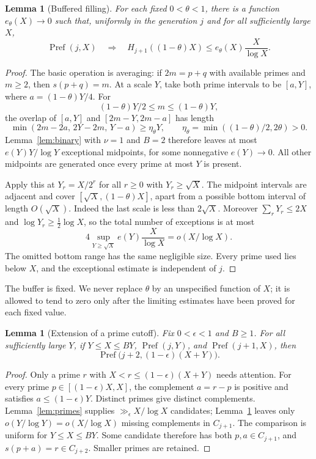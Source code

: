 \documentclass[11pt,letterpaper]{article}
\numberwithin{equation}{section}
\newtheorem{lemma}[theorem]{Lemma}
\theoremstyle{definition}
\theoremstyle{remark}
\DeclareMathOperator{\Pref}{Pref}
\begin{document}
\begin{lemma}[Buffered filling]\label{lem:buffer}
For each fixed $0<\theta<1$, there is a function $e_\theta(X)\to0$
such that, uniformly in the generation $j$ and for all sufficiently large $X$,
\begin{equation}\label{eq:buffer}
 \Pref(j,X)\quad\Longrightarrow\quad
 H_{j+1}((1-\theta)X)\le e_\theta(X)\frac X{\log X}.
\end{equation}
\end{lemma}

\begin{proof}
The basic operation is averaging: if $2m=p+q$ with available primes and
$m\ge2$, then $s(p+q)=m$.
At a scale $Y$, take both prime intervals to be $[a,Y]$, where
$a=(1-\theta)Y/4$. For
\[
 (1-\theta)Y/2\le m\le(1-\theta)Y,
\]
the overlap of $[a,Y]$ and $[2m-Y,2m-a]$ has length
\[
 \min(2m-2a,\,2Y-2m,\,Y-a)
 \ge\eta_\theta Y,\qquad
 \eta_\theta=\min((1-\theta)/2,2\theta)>0.
\]
Lemma~\ref{lem:binary} with $\nu=1$ and $B=2$ therefore leaves at most
$e(Y)Y/\log Y$ exceptional midpoints, for some nonnegative $e(Y)\to0$.
All other midpoints are generated once every prime at most $Y$ is present.

Apply this at $Y_r=X/2^r$ for all $r\ge0$ with $Y_r\ge\sqrt X$.
The midpoint intervals are adjacent and cover
$[\sqrt X,(1-\theta)X]$, apart from a possible bottom interval of
length $O(\sqrt X)$. Indeed the last scale is less than $2\sqrt X$.
Moreover $\sum_rY_r\le2X$ and $\log Y_r\ge\frac12\log X$, so the
total number of exceptions is at most
\[
 4\sup_{Y\ge\sqrt X}e(Y)\frac X{\log X}
 =o(X/\log X).
\]
The omitted bottom range has the same negligible size. Every prime used
lies below $X$, and the exceptional estimate is independent of $j$.
\end{proof}

The buffer is fixed. We never replace $\theta$ by an unspecified function
of $X$; it is allowed to tend to zero only after the limiting estimates
have been proved for each fixed value.

\begin{lemma}[Extension of a prime cutoff]\label{lem:extension}
Fix $0<\epsilon<1$ and $B\ge1$. For all sufficiently large $Y$, if
$Y\le X\le BY$, $\Pref(j,Y)$, and $\Pref(j+1,X)$, then
\begin{equation}\label{eq:extension}
 \Pref\bigl(j+2,(1-\epsilon)(X+Y)\bigr).
\end{equation}
\end{lemma}

\begin{proof}
Only a prime $r$ with $X<r\le(1-\epsilon)(X+Y)$ needs attention.
For every prime $p\in[(1-\epsilon)X,X]$, the complement $a=r-p$ is
positive and satisfies $a\le(1-\epsilon)Y$. Distinct primes give
distinct complements. Lemma~\ref{lem:primes} supplies
$\gg_\epsilon X/\log X$ candidates; Lemma~\ref{lem:buffer} leaves only
$o(Y/\log Y)=o(X/\log X)$ missing complements in $C_{j+1}$.
The comparison is uniform for $Y\le X\le BY$.
Some candidate therefore has both $p,a\in C_{j+1}$, and
$s(p+a)=r\in C_{j+2}$. Smaller primes are retained.
\end{proof}
\end{document}
